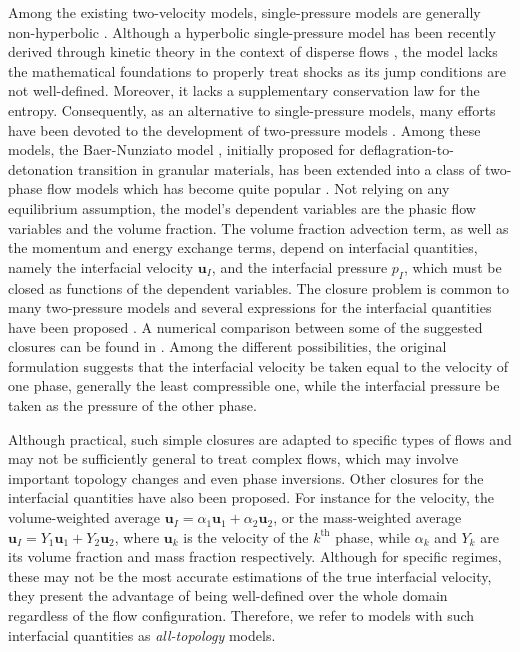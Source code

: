 \documentclass{myclass}
\newcommand{\vel}{\bm{u}}
\begin{document}
Among the existing two-velocity models, single-pressure models are generally non-hyperbolic \cite{ishii:1975,stuhmiller:1977,ramshaw:1978,vazquez-gonzalez:2016}. Although a hyperbolic single-pressure model has been recently derived through kinetic theory in the context of disperse flows \cite{fox:2020}, the model lacks the mathematical foundations to properly treat shocks as its jump conditions are not well-defined. Moreover, it lacks a supplementary conservation law for the entropy. Consequently, as an alternative to single-pressure models, many efforts have been devoted to the development of two-pressure models \cite{ransom:1984,baer:1986,chen:1996,saurel:1999}. Among these models, the Baer-Nunziato model \cite{baer:1986}, initially proposed for deflagration-to-detonation transition in granular materials, has been extended into a class of two-phase flow models which has become quite popular \cite{saurel:1999,saurel:2001,gallouet:2004,tokareva:2010,coquel:2013,hantke:2019,thanh:2022}. Not relying on any equilibrium assumption, the model's dependent variables are the phasic flow variables and the volume fraction. The volume fraction advection term, as well as the momentum and energy exchange terms, depend on interfacial quantities, namely the interfacial velocity $\vel_I$, and the interfacial pressure $p_I$, which must be closed as functions of the dependent variables. The closure problem is common to many two-pressure models and several expressions for the interfacial quantities have been proposed \cite{ransom:1984,chen:1996,saurel:1999,saurel:2001,saurel:2003,gallouet:2004,jin:2006,perrier:2021}. A numerical comparison between some of the suggested closures can be found in \cite{guillemaud:2007,lochon:2016}. Among the different possibilities, the original formulation \cite{baer:1986} suggests that the interfacial velocity be taken equal to the velocity of one phase, generally the least compressible one, while the interfacial pressure be taken as the pressure of the other phase. 

Although practical, such simple closures are adapted to specific types of flows and may not be sufficiently general to treat complex flows, which may involve important topology changes and even phase inversions. Other closures for the interfacial quantities have also been proposed. For instance for the velocity, the volume-weighted average $\vel_I=\alpha_1 \vel_1 + \alpha_2 \vel_2$, or the mass-weighted average $\vel_I = Y_1 \vel_1 + Y_2 \vel_2$, where $\vel_k$ is the velocity of the $k^\text{th}$ phase, while $\alpha_k$ and $Y_k$ are its volume fraction and mass fraction respectively. Although for specific regimes, these may not be the most accurate estimations of the true interfacial velocity, they present the advantage of being well-defined over the whole domain regardless of the flow configuration. Therefore, we refer to models with such interfacial quantities as \textit{all-topology} models.
\end{document}
